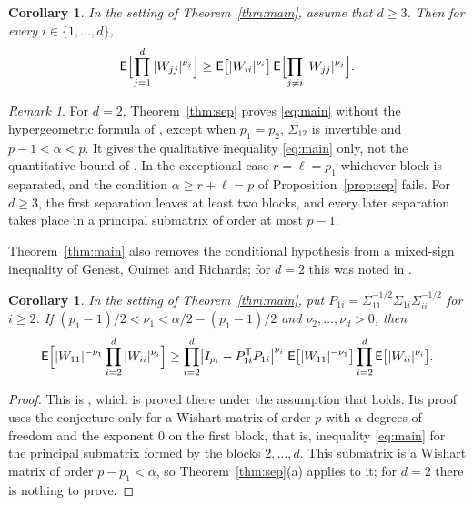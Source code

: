 \documentclass{amsart}
\newtheorem{corollary}[theorem]{Corollary}
\theoremstyle{definition}
\theoremstyle{remark}
\newtheorem{remark}[theorem]{Remark}
\numberwithin{equation}{section}
\newcommand{\E}{\mathsf{E}}
\begin{document}
\begin{corollary}\label{cor:onevsrest}
In the setting of Theorem~\ref{thm:main}, assume that $d\ge3$. Then for every $i\in\{1,\dots,d\}$,
\[
\E\Bigl[\prod_{j=1}^d|W_{jj}|^{\nu_j}\Bigr]\ge\E\bigl[|W_{ii}|^{\nu_i}\bigr]\,\E\Bigl[\prod_{j\ne i}|W_{jj}|^{\nu_j}\Bigr].
\]
\end{corollary}

\begin{remark}
For $d=2$, Theorem~\ref{thm:sep} proves \eqref{eq:main} without the hypergeometric formula of \cite{GOR25}, except when $p_1=p_2$, $\Sigma_{12}$ is invertible and $p-1<\alpha<p$. It gives the qualitative inequality \eqref{eq:main} only, not the quantitative bound of \cite[Corollary~3.4]{GOR25}. In the exceptional case $r=\ell=p_1$ whichever block is separated, and the condition $\alpha\ge r+\ell=p$ of Proposition~\ref{prop:sep} fails. For $d\ge3$, the first separation leaves at least two blocks, and every later separation takes place in a principal submatrix of order at most $p-1$.
\end{remark}

Theorem~\ref{thm:main} also removes the conditional hypothesis from a mixed-sign inequality of Genest, Ouimet and Richards; for $d=2$ this was noted in \cite[Remark~3.10]{GOR24a}.

\begin{corollary}\label{cor:mixed}
In the setting of Theorem~\ref{thm:main}, put $P_{1i}=\Sigma_{11}^{-1/2}\Sigma_{1i}\Sigma_{ii}^{-1/2}$ for $i\ge2$. If $(p_1-1)/2<\nu_1<\alpha/2-(p_1-1)/2$ and $\nu_2,\dots,\nu_d>0$, then
\[
\E\Bigl[|W_{11}|^{-\nu_1}\prod_{i=2}^d|W_{ii}|^{\nu_i}\Bigr]\ge\prod_{i=2}^d\bigl|I_{p_i}-P_{1i}^{\mathsf T}P_{1i}\bigr|^{\nu_i}\;\E\bigl[|W_{11}|^{-\nu_1}\bigr]\prod_{i=2}^d\E\bigl[|W_{ii}|^{\nu_i}\bigr].
\]
\end{corollary}

\begin{proof}
This is \cite[Proposition~3.9]{GOR24a}, which is proved there under the assumption that \cite[Conjecture~1.1]{GOR24a} holds. Its proof uses the conjecture only for a Wishart matrix of order $p$ with $\alpha$ degrees of freedom and the exponent $0$ on the first block, that is, inequality \eqref{eq:main} for the principal submatrix formed by the blocks $2,\dots,d$. This submatrix is a Wishart matrix of order $p-p_1<\alpha$, so Theorem~\ref{thm:sep}(a) applies to it; for $d=2$ there is nothing to prove.
\end{proof}
\end{document}
